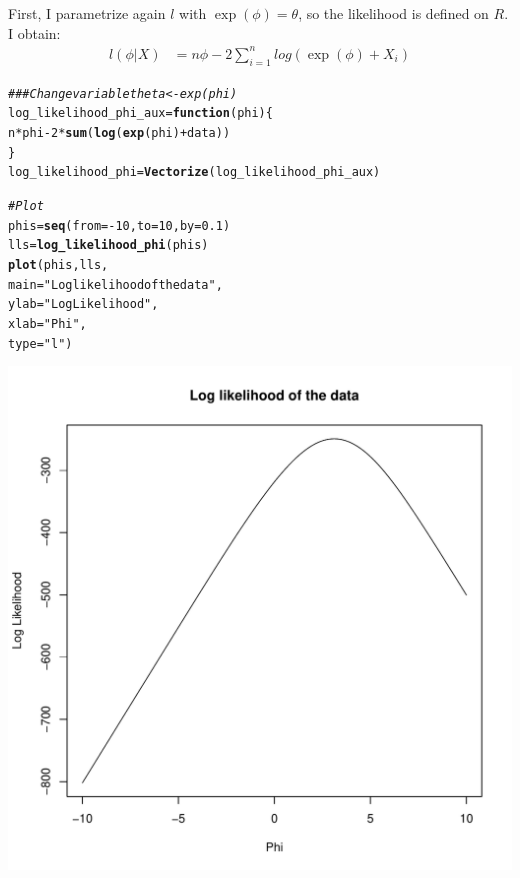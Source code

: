\documentclass[11pt]{article}\usepackage[]{graphicx}\usepackage[]{color}
\makeatletter
\def\maxwidth{ %
  \ifdim\Gin@nat@width>\linewidth
    \linewidth
  \else
    \Gin@nat@width
  \fi
}
\newcommand{\hlnum}[1]{\textcolor[rgb]{0.686,0.059,0.569}{#1}}%
\newcommand{\hlstr}[1]{\textcolor[rgb]{0.192,0.494,0.8}{#1}}%
\newcommand{\hlcom}[1]{\textcolor[rgb]{0.678,0.584,0.686}{\textit{#1}}}%
\newcommand{\hlopt}[1]{\textcolor[rgb]{0,0,0}{#1}}%
\newcommand{\hlstd}[1]{\textcolor[rgb]{0.345,0.345,0.345}{#1}}%
\newcommand{\hlkwa}[1]{\textcolor[rgb]{0.161,0.373,0.58}{\textbf{#1}}}%
\newcommand{\hlkwb}[1]{\textcolor[rgb]{0.69,0.353,0.396}{#1}}%
\newcommand{\hlkwc}[1]{\textcolor[rgb]{0.333,0.667,0.333}{#1}}%
\newcommand{\hlkwd}[1]{\textcolor[rgb]{0.737,0.353,0.396}{\textbf{#1}}}%
\newenvironment{kframe}{%
 \def\at@end@of@kframe{}%
 \ifinner\ifhmode%
  \def\at@end@of@kframe{\end{minipage}}%
  \begin{minipage}{\columnwidth}%
 \fi\fi%
 \def\FrameCommand##1{\hskip\@totalleftmargin \hskip-\fboxsep
 \colorbox{shadecolor}{##1}\hskip-\fboxsep
     \hskip-\linewidth \hskip-\@totalleftmargin \hskip\columnwidth}%
 \MakeFramed {\advance\hsize-\width
   \@totalleftmargin\z@ \linewidth\hsize
   \@setminipage}}%
 {\par\unskip\endMakeFramed%
 \at@end@of@kframe}
\newenvironment{knitrout}{}{} %
\makeatother
\begin{document}
\section{}
First, I parametrize again $l$ with $\exp(\phi)=\theta$, so the likelihood is defined on $R$. I obtain:
\begin{align}
l(\phi|X) &= n \phi - 2\sum_{i=1}^n log(\exp(\phi)+X_i)
\end{align}
\begin{knitrout}
\color{fgcolor}\begin{kframe}
\begin{alltt}
\hlcom{## # Change variable theta<-exp(phi)}
\hlstd{log_likelihood_phi_aux} \hlkwb{=} \hlkwa{function}\hlstd{(}\hlkwc{phi}\hlstd{)\{}
  \hlstd{n}\hlopt{*}\hlstd{phi} \hlopt{-} \hlnum{2}\hlopt{*}\hlkwd{sum}\hlstd{(}\hlkwd{log}\hlstd{(}\hlkwd{exp}\hlstd{(phi)}\hlopt{+}\hlstd{data))}
\hlstd{\}}
\hlstd{log_likelihood_phi} \hlkwb{=} \hlkwd{Vectorize}\hlstd{(log_likelihood_phi_aux)}

\hlcom{# Plot}
\hlstd{phis} \hlkwb{=} \hlkwd{seq}\hlstd{(}\hlkwc{from} \hlstd{=} \hlopt{-}\hlnum{10}\hlstd{,} \hlkwc{to} \hlstd{=} \hlnum{10}\hlstd{,} \hlkwc{by} \hlstd{=} \hlnum{0.1}\hlstd{)}
\hlstd{lls} \hlkwb{=} \hlkwd{log_likelihood_phi}\hlstd{(phis)}
\hlkwd{plot}\hlstd{(phis,lls,}
     \hlkwc{main} \hlstd{=} \hlstr{"Log likelihood of the data"}\hlstd{,}
     \hlkwc{ylab} \hlstd{=} \hlstr{"Log Likelihood"}\hlstd{,}
     \hlkwc{xlab} \hlstd{=} \hlstr{"Phi"}\hlstd{,}
     \hlkwc{type}\hlstd{=}\hlstr{"l"}\hlstd{)}
\end{alltt}
\end{kframe}
\includegraphics[width=\maxwidth]{figure/unnamed-chunk-2-1} 

\end{knitrout}
\end{document}
